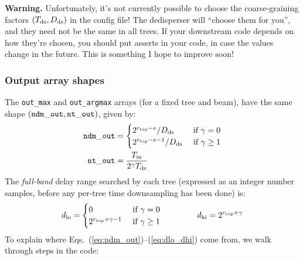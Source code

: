 \documentclass{article}
\numberwithin{equation}{section}   %
\begin{document}
{\bf Warning.} Unfortunately, it's not currently possible to choose the coarse-graining factors
$(T_{\rm ds}, D_{\rm ds})$ in the config file! The dedisperser will ``choose them for you'', and 
they need not be the same in all trees. If your downstream code depends on how they're chosen, 
you should put asserts in your code, in case the values change in the future. This is something
I hope to improve soon!

\subsubsection{Output array shapes}

The \verb|out_max| and \verb|out_argmax| arrays (for a fixed tree and beam), have the same
shape $({\tt ndm\_out}, {\tt nt\_out})$, given by:
\begin{align}
{\tt ndm\_out} &= \begin{cases}
  2^{r_{\rm top} - e} / D_{\rm ds} & \mbox{ if } \gamma=0 \\
  2^{r_{\rm top} - e - 1} / D_{\rm ds} & \mbox{ if } \gamma \ge 1
\end{cases} \label{eq:ndm_out} \\
{\tt nt\_out} &= \frac{T_{\rm in}}{2^\gamma T_{\rm ds}} \label{eq:nt_out}
\end{align}
The {\em full-band} delay range searched by each tree (expressed as an integer number samples, 
before any per-tree time downsampling has been done) is:
\begin{equation}
d_{\rm lo} = \begin{cases}
  0 & \mbox{ if } \gamma=0 \\
  2^{r_{\rm top} + \gamma - 1} & \mbox{ if } \gamma\ge 1
\end{cases}
\hspace{1.5cm}
d_{\rm hi} = 2^{r_{\rm top} + \gamma}
\label{eq:dlo_dhi}
\end{equation}
To explain where Eqs.\ (\ref{eq:ndm_out})--(\ref{eq:dlo_dhi}) come from, we walk through steps in the code:
\end{document}
